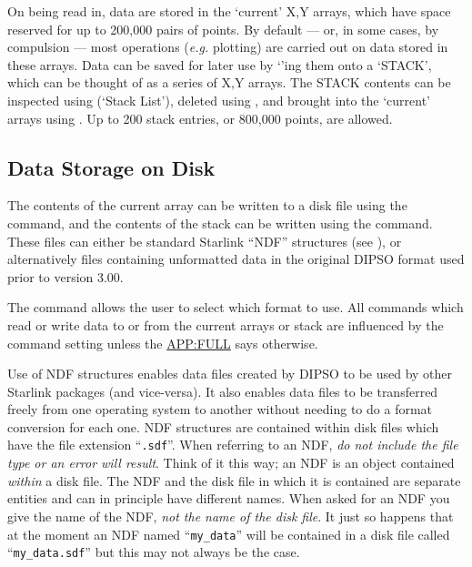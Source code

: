 On being read in, data are stored in the `current' X,Y arrays, which have
space reserved for up to 200,000 pairs of points. By default --- or, in
some cases, by compulsion --- most operations ({\em e.g.} plotting) are
carried out on data stored in these arrays. Data can be saved for later
use by `'ing  them onto a `STACK', which can
be thought of as a series of X,Y arrays. The STACK contents can be
inspected using   (`Stack List'), deleted using
,  and brought into the `current' arrays using
.  Up to 200 stack entries, or 800,000 points,
are allowed.

\subsection{Data Storage on Disk}

The contents of the current array can be written to a disk file using the
  command, and the contents of the stack
can be written using the   command. These
files can either be standard Starlink ``NDF'' structures (see
), or alternatively files containing unformatted data
in the original DIPSO format used prior to version 3.00.

The   command allows the user to select
which format to use. All commands which read or write data to or from the
current arrays or stack are influenced by the  command setting unless the \hyperref{description of the
command}{description of the command in appendix}{}{APP:FULL} says otherwise.

Use of NDF structures enables data files created by DIPSO to be used by
other Starlink packages (and vice-versa). It also enables data files to
be transferred freely from one operating system to another without
needing to do a format conversion for each one. NDF structures are
contained within disk files which have the file extension ``{\tt{.sdf}}''. 
When referring to an NDF, {\em do not include the file type or an error
will result}. Think of it this way; an NDF is an object contained {\em
within} a disk file. The NDF and the disk file in which it is contained
are separate entities and can in principle have different names. When
asked for an NDF you give the name of the NDF, {\em not the name of the
disk file}. It just so happens that at the moment an NDF named
``{\tt{my\_data}}''  will be contained in a disk file called
``{\tt{my\_data.sdf}}''  but this may not always be the case.

